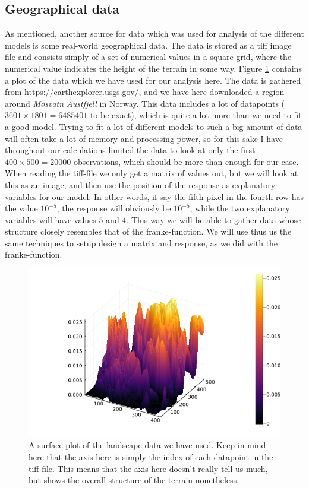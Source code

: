 \documentclass{article}
\begin{document}
\subsection{Geographical data}
As mentioned, another source for data which was used for analysis of the
different models is some real-world geographical data. The data is stored as a
tiff image file and consists simply of a set of numerical values in a square
grid, where the numerical value indicates the height of the terrain in some way.
Figure \ref{landscape-plot} contains a plot of the data which we have used for
our analysis here.  The data is gathered from
\url{https://earthexplorer.usgs.gov/}, and we have here downloaded a region
around \textit{Møsvatn Austfjell} in Norway. This data includes a lot of
datapoints ($3601\times 1801 = 6485401$ to be exact), which is quite a lot more
than we need to fit a good model. Trying to fit a lot of different models to
such a big amount of data will often take a lot of memory and processing power,
so for this sake I have throughout our calculations limited the data to look at
only the first $400\times 500 = 20000$ observations, which should be more than
enough for our case. When reading the tiff-file we only get a matrix of values
out, but we will look at this as an image, and then use the position of the
response as explanatory variables for our model. In other words, if say the
fifth pixel in the fourth row has the value $10^{-5}$, the response will
obviously be $10^{-5}$, while the two explanatory variables will have values $5$
and $4$.  This way we will be able to gather data whose structure closely
resembles that of the franke-function. We will use thus us the same techniques
to setup design a matrix and response, as we did with the franke-function.

\begin{figure}
    \centerline{\includegraphics[scale=0.5]{landscapesurface}}
    \caption{A surface plot of the landscape data we have used. Keep in mind
        here that the axis here is simply the index of each datapoint in the
        tiff-file. This means that the axis here doesn't really tell us much, but
        shows the overall structure of the terrain nonetheless.}
    \label{landscape-plot}
\end{figure}
\end{document}
